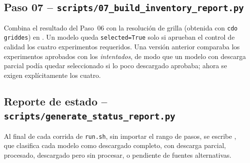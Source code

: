 \subsection{Paso 07 -- \texttt{scripts/07\_build\_inventory\_report.py}}
\label{sec:paso07}
Combina el resultado del Paso~06 con la resolución de grilla (obtenida con \texttt{cdo griddes}) en . Un modelo queda \texttt{selected=True} solo si aprueban el control de calidad los cuatro experimentos requeridos. Una versión anterior comparaba los experimentos aprobados con los \emph{intentados}, de modo que un modelo con descarga parcial podía quedar seleccionado si lo poco descargado aprobaba; ahora se exigen explícitamente los cuatro.

\subsection{Reporte de estado -- \texttt{scripts/generate\_status\_report.py}}
\label{sec:reporte}
Al final de cada corrida de \texttt{run.sh}, sin importar el rango de pasos, se escribe , que clasifica cada modelo como descargado completo, con descarga parcial, procesado, descargado pero sin procesar, o pendiente de fuentes alternativas.
